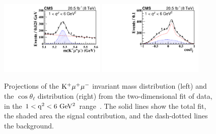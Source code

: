 \documentclass{PoS}
\begin{document}
\begin{figure}[htb]
\centering
\includegraphics[width=0.45\textwidth]{figures/CMS-BPH-15-001_Figure_003-h}
\includegraphics[width=0.45\textwidth]{figures/CMS-BPH-15-001_Figure_004-h}
\caption{
  Projections of the ${\rm K^+\mu^+\mu^-}$ invariant mass distribution (left)
  and the $\cos\theta_\ell$ distribution (right) from the two-dimensional fit
  of data, in the ${\rm 1 < q^2 < 6~GeV^2}$ range~\cite{bph-15-001}. The solid
  lines show the total fit, the shaded area the signal contribution, and the
  dash-dotted lines the background.
}
\label{fig:BPH-15-001_Figures_003-004}
\end{figure}
\end{document}
